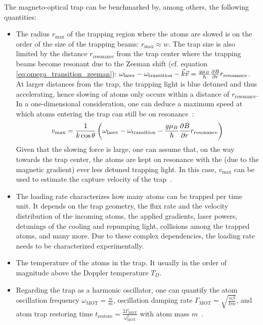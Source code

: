 The magneto-optical trap can be benchmarked by, among others, the following quantities:
\begin{itemize}
    \item The radius $r_\text{max}$ of the trapping region where the atoms are slowed  is on the order of the size of the trapping beams: $r_\text{max} \approx w$. The trap size is also limited by the distance $r_\text{resonance}$ from the trap center where the trapping beams become resonant due to the Zeeman shift (cf. equation \ref{eq:omega_transition_zeeman}): $\omega_\text{laser} - \omega_\text{transition} - \vec k \vec v = \frac{g \mu_B}{\hbar} \pdv{B}{r} r_\text{resonance}$. At larger distances from the trap, the trapping light is blue detuned and thus accelerating, hence slowing of atoms only occurs within a distance of $r_\text{resonance}$. In a one-dimensional consideration, one can deduce a maximum speed at which atoms entering the trap can still be on resonance~\cite{tiecke_high-flux_2009}:
    \begin{align}
        v_\text{max} = \frac{1}{k \cos \theta}\left(\omega_\text{laser} - \omega_\text{transition} - \frac{g \mu_B}{\hbar} \pdv{B}{r} r_\text{resonance}\right)
    \end{align}
    Given that the slowing force is large, one can assume that, on the way towards the trap center, the atoms are kept on resonance with the (due to the magnetic gradient) ever less detuned trapping light. In this case, $v_\text{max}$ can be used to estimate the capture velocity of the trap~\cite{tiecke_high-flux_2009}.
    \item The loading rate characterizes how many atoms can be trapped per time unit. It depends on the trap geometry, the flux rate and the velocity distribution of the incoming atoms, the applied gradients, laser powers, detunings of the cooling and repumping light, collisions among the trapped atoms, and many more. Due to these complex dependencies, the loading rate needs to be characterized experimentally.
    \item The temperature of the atoms in the trap. It usually in the order of magnitude above the Doppler temperature $T_D$.
    \item Regarding the trap as a harmonic oscillator, one can quantify the atom oscillation frequency $\omega_\text{MOT} = \frac{\alpha}{m}$, oscillation damping rate $\Gamma_\text{MOT} = \sqrt{\frac{\alpha \beta}{km}}$, and atom trap restoring time $t_\text{restore} = \frac{2\Gamma_\text{MOT}}{\omega_\text{MOT}^2}$ with atom mass $m$~\cite{metcalf_laser_1999}.
\end{itemize}

